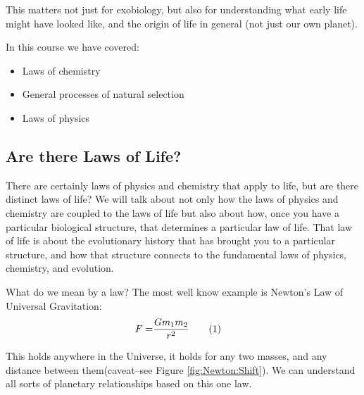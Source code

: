 \documentclass[]{article}
\newcommand\numberthis{\addtocounter{equation}{1}\tag{\theequation}}
\begin{document}
This matters not just for exobiology, but also for understanding what early life might have looked like, and the origin of life in general (not just our own planet).

In this course we have covered:
\begin{itemize}
	\item Laws of chemistry
	\item General processes of natural selection
	\item Laws of physics
\end{itemize}

\subsection{Are there Laws of Life?} 

There are certainly laws of physics and chemistry that apply to life, but are there distinct laws of life? We will talk about not only how the laws of physics and chemistry are coupled to the laws of life but also about how, once you have a particular biological structure, that determines a particular law of life. That law of life is about the evolutionary history that has brought you to a particular structure, and how that structure connects to the fundamental laws of physics, chemistry, and evolution.

What do we mean by a law? The most well know example is Newton's Law of Universal Gravitation:
\begin{align*}
	F =& \frac{G m_1 m_2}{r^2} \numberthis \label{eq:newton}
\end{align*}

This holds anywhere in the Universe, it holds for any two masses, and any distance between them(caveat--see Figure \ref{fig:Newton:Shift}). We can understand all sorts of planetary relationships based on this one law.
\end{document}
